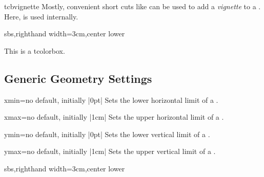 \begin{docCommand}[doc new=2016-04-22]{tcbvignette}{}
Mostly, convenient short cuts like  can
be used to add a \emph{vignette} to a . Here, 
is used internally.

\begin{dispExample*}{sbs,righthand width=3cm,center lower}
\begin{tcolorbox}[enhanced,size=small,sharp corners,
  colback=green!10,colframe=green!50!black,
  boxrule=1mm,titlerule=0mm,
  title=My title,center title,fonttitle=\bfseries,
  underlay vignette]
    This is a tcolorbox.
\end{tcolorbox}
\end{dispExample*}

\end{docCommand}



\subsection{Generic Geometry Settings}\label{subsec:vignettegeometry}


\begin{vigTcbKey}[][doc new=2016-04-22]{xmin}{=}{no default, initially |0pt|}
  Sets the lower horizontal limit of a .
\end{vigTcbKey}

\begin{vigTcbKey}[][doc new=2016-04-22]{xmax}{=}{no default, initially |1cm|}
  Sets the upper horizontal limit of a .
\end{vigTcbKey}

\begin{vigTcbKey}[][doc new=2016-04-22]{ymin}{=}{no default, initially |0pt|}
  Sets the lower vertical limit of a .
\end{vigTcbKey}

\begin{vigTcbKey}[][doc new=2016-04-22]{ymax}{=}{no default, initially |1cm|}
  Sets the upper vertical limit of a .
\end{vigTcbKey}


\begin{dispExample*}{sbs,righthand width=3cm,center lower}
\end{dispExample*}


